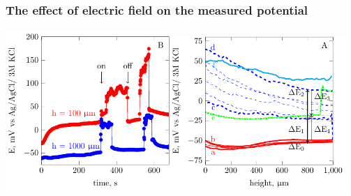 \documentclass{beamer}
\begin{document}
\begin{frame}
\frametitle{The effect of electric field on the measured potential}
\framesubtitle{}
\centering
\includegraphics[width=0.466\textwidth]{field-figure1.pdf}\includegraphics[width=0.5\textwidth]{field-figure0.pdf}
\end{frame}
\end{document}
